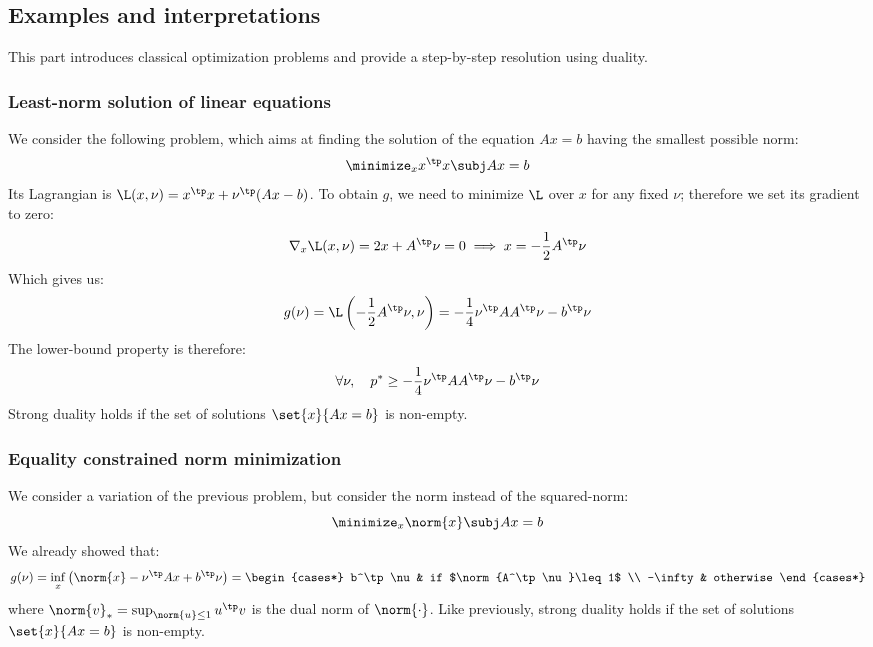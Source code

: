 \subsection{Examples and interpretations}
This part introduces classical optimization problems and provide a step-by-step resolution using duality.
\subsubsection{Least-norm solution of linear equations}
We consider the following problem, which aims at finding the solution of the equation $Ax=b$ having the smallest possible norm:
\begin{equation*}
    \minimize_x x^\tp x \subj Ax=b
\end{equation*}
Its Lagrangian is $\L(x,\nu) = x^\tp x + \nu^\tp(Ax-b)$. To obtain $g$, we need to minimize $\L$ over $x$ for any fixed $\nu$; therefore we set its gradient to zero:
\begin{equation*}
    \nabla_x\L(x,\nu) = 2x+A^\tp\nu = 0 \implies x = - \frac{1}{2}A^\tp\nu
\end{equation*}
Which gives us:
\begin{equation*}
    g(\nu) = \L\left(-\frac{1}{2}A^\tp\nu, \nu\right) = -\frac{1}{4}\nu^\tp AA^\tp\nu - b^\tp\nu
\end{equation*}
The lower-bound property is therefore:
\begin{equation*}
    \forall\nu, \quad p^* \geq -\frac{1}{4}\nu^\tp AA^\tp\nu - b^\tp\nu
\end{equation*}
Strong duality holds if the set of solutions $\set{x}{Ax=b}$ is non-empty.

\subsubsection{Equality constrained norm minimization}
We consider a variation of the previous problem, but consider the norm instead of the squared-norm:
\begin{equation*}
    \minimize_x \norm{x} \subj Ax=b
\end{equation*}
We already showed that:
\begin{equation*}
    g(\nu) = \inf_x\left(\norm{x}-\nu^\tp Ax + b^\tp\nu\right) = \begin{cases*}
        b^\tp\nu & if $\norm{A^\tp\nu}\leq1$ \\
        -\infty & otherwise
    \end{cases*}
\end{equation*}
where $\norm{v}_*=\sup_{\norm{u}\leq1}u^\tp v$ is the dual norm of $\norm{\cdot}$.
Like previously, strong duality holds if the set of solutions $\set{x}{Ax=b}$ is non-empty.

